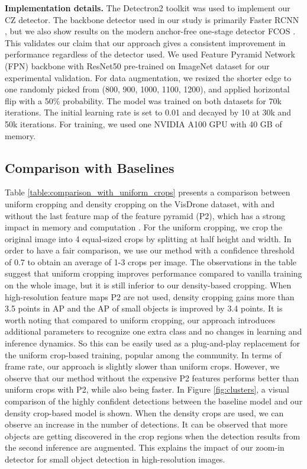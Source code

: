 \noindent \textbf{Implementation details.} The Detectron2 toolkit \cite{detectron2-wu-2019} was used to implement our CZ detector. The backbone detector used in our study is primarily Faster RCNN \cite{faster_rcnn-Ren-2015}, but we also show results on the modern anchor-free one-stage detector FCOS \cite{fcos-Tian-2019}. This validates our claim that our approach gives a consistent improvement in performance regardless of the detector used. We used Feature Pyramid Network (FPN) \cite{fpn-Lin-2017} backbone with ResNet50 \cite{resnet-He-2016}  pre-trained on ImageNet \cite{imagenet-Russakovsky-2015} dataset for our experimental validation. For data augmentation, we resized the shorter edge to one randomly picked from (800, 900, 1000, 1100, 1200), and applied horizontal flip with a 50\% probability. The model was trained on both datasets for 70k iterations. The initial learning rate is set to 0.01 and decayed by 10 at 30k and 50k iterations. For training, we used one NVIDIA A100 GPU with 40 GB of memory.


\subsection{Comparison with Baselines}

Table \ref{table:comparison_with_uniform_crops} presents a comparison between uniform cropping and density cropping on the VisDrone dataset, with and without the last feature map of the feature pyramid (P2), which has a strong impact in memory and computation \cite{querydet-Yang-2022}. For the uniform cropping, we crop the original image into 4 equal-sized crops by splitting at half height and width. In order to have a fair comparison, we use our method with a confidence threshold of 0.7 to obtain an average of  1-3 crops per image. The observations in the table suggest that uniform cropping improves performance compared to vanilla training on the whole image, but it is still inferior to our density-based cropping. When high-resolution feature maps P2 are not used, density cropping gains more than 3.5 points in AP and the AP of small objects is improved by 3.4 points. It is worth noting that compared to uniform cropping, our approach introduces additional parameters to recognize one extra class and no changes in learning and inference dynamics. So this can be easily used as a plug-and-play replacement for the uniform crop-based training, popular among the community. In terms of frame rate, our approach is slightly slower than uniform crops. However, we observe that our method without the expensive P2 features performs better than uniform crops with P2, while also being faster. In Figure \ref{fig:clusters}, a visual comparison of the highly confident detections between the baseline model and our density crop-based model is shown. When the density crops are used, we can observe an increase in the number of detections. It can be observed that more objects are getting discovered in the crop regions when the detection results from the second inference are augmented. This explains the impact of our zoom-in detector for small object detection in high-resolution images.

